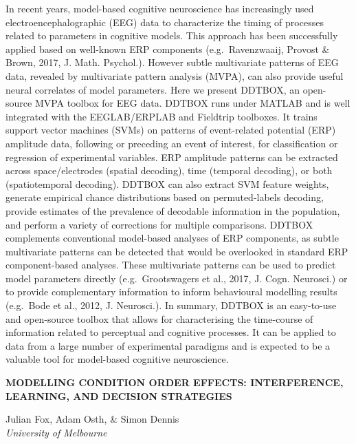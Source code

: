 \documentclass[]{article}
\begin{document}
In recent years, model-based cognitive neuroscience has increasingly
used electroencephalographic (EEG) data to characterize the timing of
processes related to parameters in cognitive models. This approach has
been successfully applied based on well-known ERP components
(e.g.~Ravenzwaaij, Provost \& Brown, 2017, J. Math. Psychol.). However
subtle multivariate patterns of EEG data, revealed by multivariate
pattern analysis (MVPA), can also provide useful neural correlates of
model parameters. Here we present DDTBOX, an open-source MVPA toolbox
for EEG data. DDTBOX runs under MATLAB and is well integrated with the
EEGLAB/ERPLAB and Fieldtrip toolboxes. It trains support vector machines
(SVMs) on patterns of event-related potential (ERP) amplitude data,
following or preceding an event of interest, for classification or
regression of experimental variables. ERP amplitude patterns can be
extracted across space/electrodes (spatial decoding), time (temporal
decoding), or both (spatiotemporal decoding). DDTBOX can also extract
SVM feature weights, generate empirical chance distributions based on
permuted-labels decoding, provide estimates of the prevalence of
decodable information in the population, and perform a variety of
corrections for multiple comparisons. DDTBOX complements conventional
model-based analyses of ERP components, as subtle multivariate patterns
can be detected that would be overlooked in standard ERP component-based
analyses. These multivariate patterns can be used to predict model
parameters directly (e.g.~Grootswagers et al., 2017, J. Cogn. Neurosci.)
or to provide complementary information to inform behavioural modelling
results (e.g.~Bode et al., 2012, J. Neurosci.). In summary, DDTBOX is an
easy-to-use and open-source toolbox that allows for characterising the
time-course of information related to perceptual and cognitive
processes. It can be applied to data from a large number of experimental
paradigms and is expected to be a valuable tool for model-based
cognitive neuroscience.\\
\pagebreak  

\textbf{MODELLING CONDITION ORDER EFFECTS: INTERFERENCE, LEARNING, AND
DECISION STRATEGIES}

Julian Fox, Adam Osth, \& Simon Dennis\\
\emph{University of Melbourne}
\end{document}
